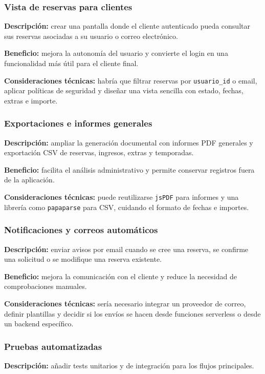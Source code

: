 \documentclass[11pt,a4paper]{article}
\begin{document}
\subsubsection{Vista de reservas para clientes}
\textbf{Descripción:} crear una pantalla donde el cliente autenticado pueda consultar sus reservas asociadas a su usuario o correo electrónico.

\textbf{Beneficio:} mejora la autonomía del usuario y convierte el login en una funcionalidad más útil para el cliente final.

\textbf{Consideraciones técnicas:} habría que filtrar reservas por \texttt{usuario\_id} o email, aplicar políticas de seguridad y diseñar una vista sencilla con estado, fechas, extras e importe.

\subsubsection{Exportaciones e informes generales}
\textbf{Descripción:} ampliar la generación documental con informes PDF generales y exportación CSV de reservas, ingresos, extras y temporadas.

\textbf{Beneficio:} facilita el análisis administrativo y permite conservar registros fuera de la aplicación.

\textbf{Consideraciones técnicas:} puede reutilizarse \texttt{jsPDF} para informes y una librería como \texttt{papaparse} para CSV, cuidando el formato de fechas e importes.

\subsubsection{Notificaciones y correos automáticos}
\textbf{Descripción:} enviar avisos por email cuando se cree una reserva, se confirme una solicitud o se modifique una reserva existente.

\textbf{Beneficio:} mejora la comunicación con el cliente y reduce la necesidad de comprobaciones manuales.

\textbf{Consideraciones técnicas:} sería necesario integrar un proveedor de correo, definir plantillas y decidir si los envíos se hacen desde funciones serverless o desde un backend específico.

\subsubsection{Pruebas automatizadas}
\textbf{Descripción:} añadir tests unitarios y de integración para los flujos principales.
\end{document}
